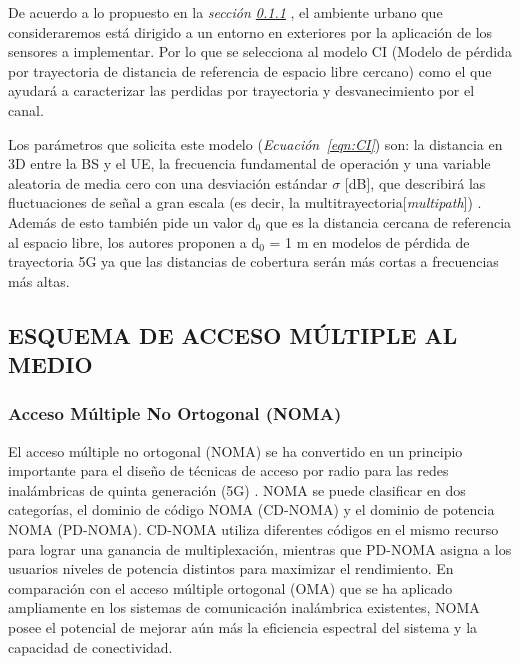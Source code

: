 De acuerdo a lo propuesto en la \textit{sección \ref{} }, el ambiente urbano que consideraremos está dirigido a un entorno en exteriores por la aplicación de los sensores a implementar. Por lo que se selecciona al modelo CI (Modelo de pérdida por trayectoria de distancia de referencia de espacio libre cercano) como el que ayudará a caracterizar las perdidas por trayectoria y desvanecimiento por el canal. 

Los parámetros que solicita este modelo (\textit{Ecuación~\ref{eqn:CI}}) son: la distancia en 3D entre la BS y el UE, la frecuencia fundamental de operación y una variable aleatoria de media cero con una desviación estándar $\sigma$ [dB], que describirá las fluctuaciones de señal a gran escala (es decir, la multitrayectoria[\textit{multipath}]) . Además de esto también pide un valor d${}_{0}$ que es la distancia cercana de referencia al espacio libre, los autores proponen a d${}_{0}$ = 1 m en modelos de pérdida de trayectoria 5G ya que las distancias de cobertura serán más cortas a frecuencias más altas. 


\subsection{ESQUEMA DE ACCESO MÚLTIPLE AL MEDIO}

\subsubsection{Acceso Múltiple No Ortogonal (NOMA)}

El acceso múltiple no ortogonal (NOMA) se ha convertido en un principio importante para el diseño de técnicas de acceso por radio para las redes inalámbricas de quinta generación (5G) \parencite{DIng2017}. NOMA se puede clasificar en dos categorías, el dominio de código NOMA (CD-NOMA) y el dominio de potencia NOMA (PD-NOMA). CD-NOMA utiliza diferentes códigos en el mismo recurso para lograr una ganancia de multiplexación, mientras que PD-NOMA asigna a los usuarios niveles de potencia distintos para maximizar el rendimiento. En comparación con el acceso múltiple ortogonal (OMA) que se ha aplicado ampliamente en los sistemas de comunicación inalámbrica existentes, NOMA posee el potencial de mejorar aún más la eficiencia espectral del sistema y la capacidad de conectividad.\newline

